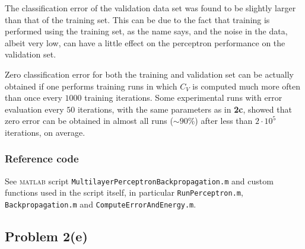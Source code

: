 \documentclass[12pt,titlepage]{article}
\begin{document}
The classification error of the validation data set was found to be slightly larger than that of the training set. This can be due to the fact that training is performed using the training set, as the name says, and the noise in the data, albeit very low, can have a little effect on the perceptron performance on the validation set. %

Zero classification error for both the training and validation set can be actually obtained if one performs training runs in which $C_V$ is computed much more often than once every $1000$ training iterations. Some experimental runs with error evaluation every $50$ iterations, with the same parameters as in \textbf{2c}, showed that zero error can be obtained in almost all runs ($\sim 90\%$) after less than $2\cdot 10^5$ iterations, on average.

\vfill

\subsubsection*{Reference code}
\vspace*{-0.2cm}
See \textsc{matlab} script \verb!MultilayerPerceptronBackpropagation.m! and custom functions used in the script itself, in particular \verb!RunPerceptron.m!, \verb!Backpropagation.m! and \verb!ComputeErrorAndEnergy.m!.

\clearpage


\subsection*{Problem 2(e)}
\end{document}
